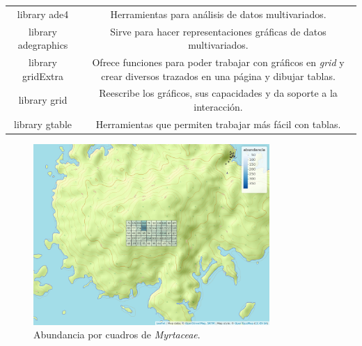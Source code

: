\documentclass[11pt,]{article}
\begin{document}
\begin{longtable}[]{@{}cc@{}}
\begin{minipage}[t]{0.14\columnwidth}
library ade4\strut
\end{minipage} & \begin{minipage}[t]{0.80\columnwidth}\centering\strut
Herramientas para análisis de datos multivariados.\strut
\end{minipage}\tabularnewline
\begin{minipage}[t]{0.14\columnwidth}\centering\strut
library adegraphics\strut
\end{minipage} & \begin{minipage}[t]{0.80\columnwidth}\centering\strut
Sirve para hacer representaciones gráficas de datos multivariados.\strut
\end{minipage}\tabularnewline
\begin{minipage}[t]{0.14\columnwidth}\centering\strut
library gridExtra\strut
\end{minipage} & \begin{minipage}[t]{0.80\columnwidth}\centering\strut
Ofrece funciones para poder trabajar con gráficos en \emph{grid} y crear
diversos trazados en una página y dibujar tablas.\strut
\end{minipage}\tabularnewline
\begin{minipage}[t]{0.14\columnwidth}\centering\strut
library grid\strut
\end{minipage} & \begin{minipage}[t]{0.80\columnwidth}\centering\strut
Reescribe los gráficos, sus capacidades y da soporte a la
interacción.\strut
\end{minipage}\tabularnewline
\begin{minipage}[t]{0.14\columnwidth}\centering\strut
library gtable\strut
\end{minipage} & \begin{minipage}[t]{0.80\columnwidth}\centering\strut
Herramientas que permiten trabajar más fácil con tablas.\strut
\end{minipage}\tabularnewline
\bottomrule
\end{longtable}

\begin{figure}
\centering
\includegraphics[width=0.80000\textwidth]{mapa_cuadros_abun_mi_familia.png}
\caption{Abundancia por cuadros de
\emph{Myrtaceae}.\label{fig:abumifam}}
\end{figure}
\end{document}
